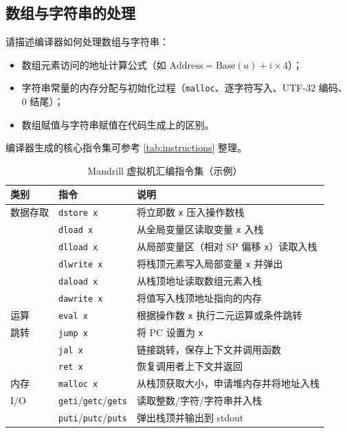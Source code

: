\documentclass[12pt,hyperref,a4paper,UTF8]{ctexart}
\begin{document}
\subsection{数组与字符串的处理}

请描述编译器如何处理数组与字符串：
\begin{itemize}
    \item 数组元素访问的地址计算公式（如 $\text{Address} = \text{Base}(a) + i \times 4$）；
    \item 字符串常量的内存分配与初始化过程（\texttt{malloc}、逐字符写入、UTF-32 编码、0 结尾）；
    \item 数组赋值与字符串赋值在代码生成上的区别。
\end{itemize}

编译器生成的核心指令集可参考 \autoref{tab:instructions} 整理。

\begin{table}[!htbp]
    \centering
    \caption{Mandrill 虚拟机汇编指令集（示例）}
    \label{tab:instructions}
    \begin{tabular}{l|l|l}
    \hline
    类别 & 指令 & 说明 \\ \hline
    数据存取 & \texttt{dstore x} & 将立即数 \texttt{x} 压入操作数栈 \\
     & \texttt{dload x} & 从全局变量区读取变量 \texttt{x} 入栈 \\
     & \texttt{dlload x} & 从局部变量区（相对 SP 偏移 \texttt{x}）读取入栈 \\
     & \texttt{dlwrite x} & 将栈顶元素写入局部变量 \texttt{x} 并弹出 \\
     & \texttt{daload x} & 从栈顶地址读取数组元素入栈 \\
     & \texttt{dawrite x} & 将值写入栈顶地址指向的内存 \\
    运算 & \texttt{eval x} & 根据操作数 \texttt{x} 执行二元运算或条件跳转 \\
    跳转 & \texttt{jump x} & 将 PC 设置为 \texttt{x} \\
     & \texttt{jal x} & 链接跳转，保存上下文并调用函数 \\
     & \texttt{ret x} & 恢复调用者上下文并返回 \\
    内存 & \texttt{malloc x} & 从栈顶获取大小，申请堆内存并将地址入栈 \\
    I/O & \texttt{geti}/\texttt{getc}/\texttt{gets} & 读取整数/字符/字符串并入栈 \\
     & \texttt{puti}/\texttt{putc}/\texttt{puts} & 弹出栈顶并输出到 stdout \\ \hline
    \end{tabular}
\end{table}
\end{document}

